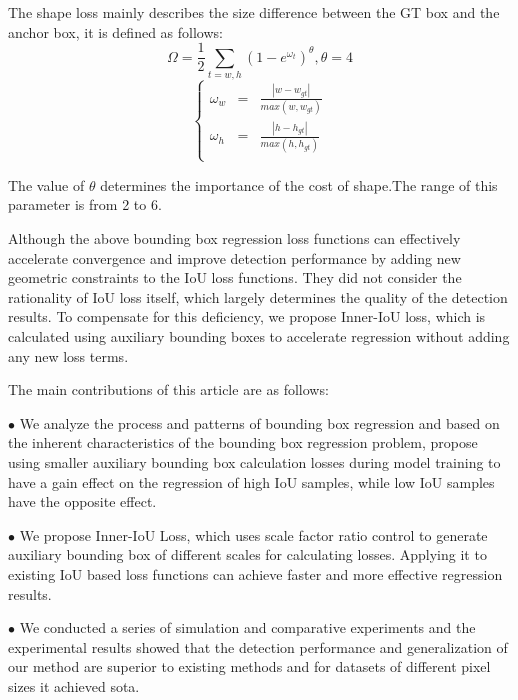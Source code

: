 \documentclass[lettersize,journal]{IEEEtran}
\begin{document}
	\par The shape loss mainly describes the size difference between the GT box and the anchor box, it is defined as follows:
	\begin{equation}
		\Omega=\frac{1}{2}\sum_{t=w,h}(1-e^{\omega_{t}})^{\theta},\theta=4
	\end{equation}
	\begin{equation}
		\left\{
		\begin{aligned}
			\displaystyle\omega_{w} & = & \frac{\left\vert w - w_{gt} \right\vert}{max(w,w_{gt})} \\
			\displaystyle\omega_{h} & = & \frac{\left\vert h - h_{gt} \right\vert}{max(h,h_{gt})} \\
		\end{aligned}
		\right.
	\end{equation}
	\par The value of $\theta$ determines the importance of the cost of shape.The range of this parameter is from 2 to 6.
	\par Although the above bounding box regression loss functions can effectively accelerate convergence and improve detection performance by adding new geometric constraints to the IoU loss functions. They did not consider the rationality of IoU loss itself, which largely determines the quality of the detection results. To compensate for this deficiency, we propose Inner-IoU loss, which is calculated using auxiliary bounding boxes to accelerate regression without adding any new loss terms.
	\par The main contributions of this article are as follows:
	\par$\bullet$ We analyze the process and patterns of bounding box regression and based on the inherent characteristics of the bounding box regression problem, propose using smaller auxiliary bounding box calculation losses during model training to have a gain effect on the regression of high IoU samples, while low IoU samples have the opposite effect.
	\par$\bullet$ We propose Inner-IoU Loss, which uses scale factor ratio control to generate auxiliary bounding box of different scales for calculating losses. Applying it to existing IoU based loss functions can achieve faster and more effective regression results.
	\par$\bullet$ We conducted a series of simulation and comparative experiments and the experimental results showed that the detection performance and generalization of our method are superior to existing methods and for datasets of different pixel sizes it achieved sota.
\end{document}
